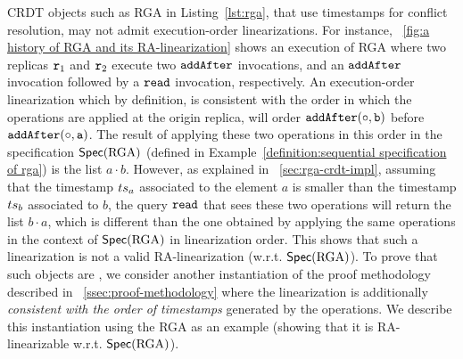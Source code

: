 CRDT objects such as RGA in Listing~\ref{lst:rga}, that use timestamps for conflict resolution, may not admit execution-order linearizations. 
For instance, \figureautorefname~\ref{fig:a history of RGA and its RA-linearization} shows an execution of RGA where two replicas $\mathtt{r}_1$ and $\mathtt{r}_2$ execute two ${\tt addAfter}$ invocations, and an ${\tt addAfter}$ invocation followed by a ${\tt read}$ invocation, respectively. An execution-order linearization which by definition, is consistent with the order in which the operations are applied at the origin replica, will order $\alabelshort[{\tt addAfter}]{\circ,b}$ before $\alabelshort[{\tt addAfter}]{\circ,a}$. The result of applying these two operations in this order in the specification $\mathsf{Spec}(\text{RGA})$ (defined in Example~\ref{definition:sequential specification of rga}) is the list $a\cdot b$. However, as explained in \sectionautorefname~\ref{sec:rga-crdt-impl}, assuming that the timestamp $ts_a$ associated to the element $a$ is smaller than the timestamp $ts_b$ associated to $b$, the query ${\tt read}$ that sees these two operations will return the list $b\cdot a$, which is different than the one obtained by applying the same operations in the context of $\mathsf{Spec}(\text{RGA})$ in linearization order. This shows that such a linearization is not a valid RA-linearization (w.r.t. $\mathsf{Spec}(\text{RGA})$).
To prove that such objects are \crdtlinearizable{}, we consider another instantiation of the proof methodology described in \sectionautorefname~\ref{ssec:proof-methodology} where the linearization is additionally \emph{consistent with the order of timestamps} generated by the operations.
We describe this instantiation using the RGA as an example (showing that it is RA-linearizable w.r.t. $\mathsf{Spec}(\text{RGA})$).

